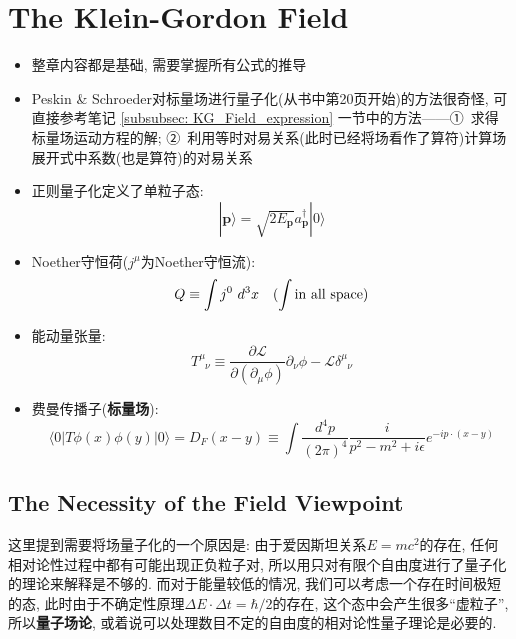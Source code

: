 \chapter{The Klein-Gordon Field}

\begin{itemize}
  \item 整章内容都是基础, 需要掌握所有公式的推导
  \item Peskin \& Schroeder对标量场进行量子化(从书中第20页开始)的方法很奇怪, 可直接参考笔记 \ref{subsubsec: KG_Field_expression} 一节中的方法——①\ 求得标量场运动方程的解; ②\ 利用等时对易关系(此时已经将场看作了算符)计算场展开式中系数(也是算符)的对易关系
  \item 正则量子化定义了单粒子态:
        \begin{equation*}
          |\mathbf{p}\rangle = \sqrt{2E_{\mathbf{p}}}a^{\dagger}_{\mathbf{p}}|0\rangle
        \end{equation*}
  \item Noether守恒荷($j^\mu$为Noether守恒流):
        \begin{equation*}
          Q \equiv \int j^0\ d^3x \quad (\int {\rm in\ all\ space})
        \end{equation*}
  \item 能动量张量:
        \begin{equation*}
          T^{\mu}_{\phantom{\mu}\nu}\equiv \frac{\partial \mathcal{L}}{\partial (\partial_{\mu} \phi)} \partial_{\nu} \phi - \mathcal{L}\delta^{\mu}_{\phantom{\mu}\nu}
        \end{equation*}
  \item 费曼传播子(\textbf{标量场}):
        \begin{equation*}
          \langle 0|T\phi(x)\phi(y)|0 \rangle = D_F(x-y)\equiv \int \frac{d^4 p}{(2\pi)^4} \frac{i}{p^2 - m^2 +i\epsilon} e^{-ip\cdot (x-y)}
        \end{equation*}
\end{itemize}
\pagestyle{general}

\section{The Necessity of the Field Viewpoint}

这里提到需要将场量子化的一个原因是: 由于爱因斯坦关系$E = mc^2$的存在, 任何相对论性过程中都有可能出现正负粒子对, 所以用只对有限个自由度进行了量子化的理论来解释是不够的.
而对于能量较低的情况, 我们可以考虑一个存在时间极短的态, 此时由于不确定性原理$\Delta E \cdot \Delta t = \hbar /2$的存在, 这个态中会产生很多“虚粒子”, 所以\textbf{量子场论}, 或着说可以处理数目不定的自由度的相对论性量子理论是必要的.

